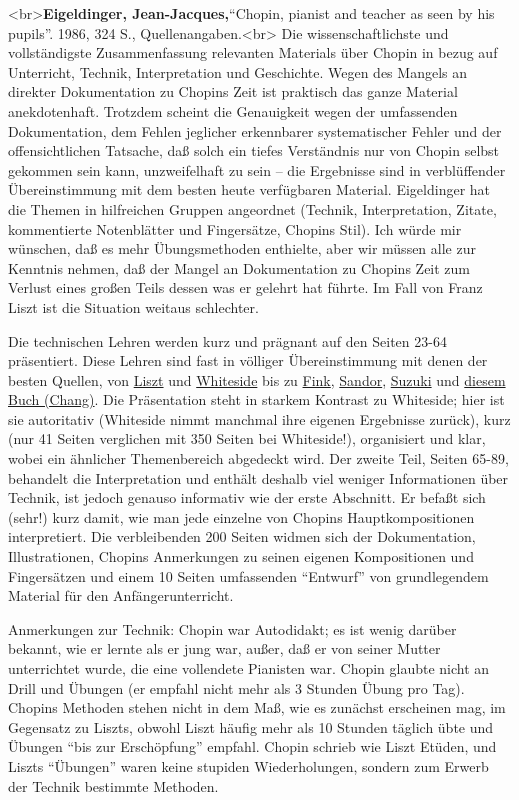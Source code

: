 \label{Eigeldinger}

<br>\textbf{Eigeldinger, Jean-Jacques,}\enquote{Chopin, pianist and teacher as seen by his pupils}. 1986, 324 S., Quellenangaben.<br>
Die wissenschaftlichste und vollständigste Zusammenfassung relevanten Materials über Chopin in bezug auf Unterricht, Technik, Interpretation und Geschichte.
Wegen des Mangels an direkter Dokumentation zu Chopins Zeit ist praktisch das ganze Material anekdotenhaft.
Trotzdem scheint die Genauigkeit wegen der umfassenden Dokumentation, dem Fehlen jeglicher erkennbarer systematischer Fehler und der offensichtlichen Tatsache, daß solch ein tiefes Verständnis nur von Chopin selbst gekommen sein kann, unzweifelhaft zu sein -- die Ergebnisse sind in verblüffender Übereinstimmung mit dem besten heute verfügbaren Material.
Eigeldinger hat die Themen in hilfreichen Gruppen angeordnet (Technik, Interpretation, Zitate, kommentierte Notenblätter und Fingersätze, Chopins Stil).
Ich würde mir wünschen, daß es mehr Übungsmethoden enthielte, aber wir müssen alle zur Kenntnis nehmen, daß der Mangel an Dokumentation zu Chopins Zeit zum Verlust eines großen Teils dessen was er gelehrt hat führte.
Im Fall von Franz Liszt ist die Situation weitaus schlechter.

Die technischen Lehren werden kurz und prägnant auf den Seiten 23-64 präsentiert.
Diese Lehren sind fast in völliger Übereinstimmung mit denen der besten Quellen, von \hyperref[Walker]{Liszt} und \hyperref[Whiteside]{Whiteside} bis zu \hyperref[Fink]{Fink}, \hyperref[Sandor]{Sandor}, \hyperref[Suzuki]{Suzuki} und \hyperref[Chang]{diesem Buch (Chang)}.
Die Präsentation steht in starkem Kontrast zu Whiteside; hier ist sie autoritativ (Whiteside nimmt manchmal ihre eigenen Ergebnisse zurück), kurz (nur 41 Seiten verglichen mit 350 Seiten bei Whiteside!), organisiert und klar, wobei ein ähnlicher Themenbereich abgedeckt wird.
Der zweite Teil, Seiten 65-89, behandelt die Interpretation und enthält deshalb viel weniger Informationen über Technik, ist jedoch genauso informativ wie der erste Abschnitt.
Er befaßt sich (sehr!) kurz damit, wie man jede einzelne von Chopins Hauptkompositionen interpretiert.
Die verbleibenden 200 Seiten widmen sich der Dokumentation, Illustrationen, Chopins Anmerkungen zu seinen eigenen Kompositionen und Fingersätzen und einem 10 Seiten umfassenden \enquote{Entwurf} von grundlegendem Material für den Anfängerunterricht.

Anmerkungen zur Technik: Chopin war Autodidakt; es ist wenig darüber bekannt, wie er lernte als er jung war, außer, daß er von seiner Mutter unterrichtet wurde, die eine vollendete Pianisten war.
Chopin glaubte nicht an Drill und Übungen (er empfahl nicht mehr als 3 Stunden Übung pro Tag).
Chopins Methoden stehen nicht in dem Maß, wie es zunächst erscheinen mag, im Gegensatz zu Liszts, obwohl Liszt häufig mehr als 10 Stunden täglich übte und Übungen \enquote{bis zur Erschöpfung} empfahl.
Chopin schrieb wie Liszt Etüden, und Liszts \enquote{Übungen} waren keine stupiden Wiederholungen, sondern zum Erwerb der Technik bestimmte Methoden.

